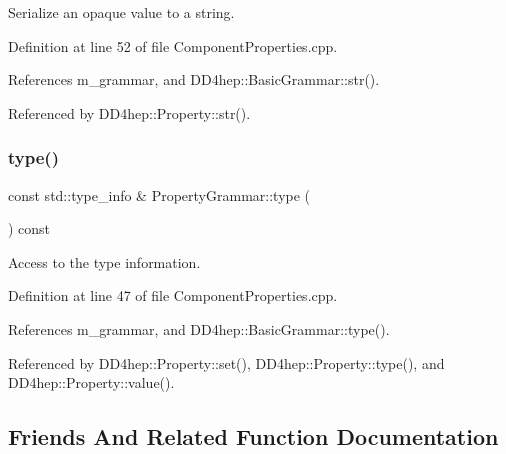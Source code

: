 Serialize an opaque value to a string. 



Definition at line 52 of file Component\+Properties.\+cpp.



References m\+\_\+grammar, and D\+D4hep\+::\+Basic\+Grammar\+::str().



Referenced by D\+D4hep\+::\+Property\+::str().

\hypertarget{class_d_d4hep_1_1_property_grammar_aea4c24c398e36de2b67b65f8083a62a8}{}\label{class_d_d4hep_1_1_property_grammar_aea4c24c398e36de2b67b65f8083a62a8} 
\subsubsection{\texorpdfstring{type()}{type()}}
{\footnotesize\ttfamily const std\+::type\+\_\+info \& Property\+Grammar\+::type (\begin{DoxyParamCaption}{ }\end{DoxyParamCaption}) const\hspace{0.3cm}{\ttfamily [virtual]}}



Access to the type information. 



Definition at line 47 of file Component\+Properties.\+cpp.



References m\+\_\+grammar, and D\+D4hep\+::\+Basic\+Grammar\+::type().



Referenced by D\+D4hep\+::\+Property\+::set(), D\+D4hep\+::\+Property\+::type(), and D\+D4hep\+::\+Property\+::value().



\subsection{Friends And Related Function Documentation}
\hypertarget{class_d_d4hep_1_1_property_grammar_a386f5a9cf65610cb62143865e5637272}{}\label{class_d_d4hep_1_1_property_grammar_a386f5a9cf65610cb62143865e5637272} 
